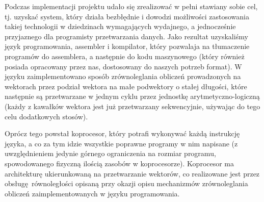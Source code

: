 Podczas implementacji projektu udało się zrealizować w pełni stawiany sobie cel, tj. uzyskać system, który działa bezbłędnie i dowodzi możliwości zastosowania takiej technologii w dziedzinach wymagających wydajnego, a jednocześnie przyjaznego dla programisty przetwarzania danych. Jako rezultat uzyskaliśmy język programowania, assembler i kompilator, który pozwalaja na tłumaczenie programów do assemblera, a następnie do kodu maszynowego (który również posiada opracowany przez nas, dostosowany do naszych potrzeb format). W języku zaimplementowano sposób zrównoleglania obliczeń prowadzonych na wektorach przez podział wektora na małe podwektory o stałej długości, które następnie są przetwarzane w jednym cyklu przez jednostkę arytmetyczno-logiczną (każdy z kawałków wektora jest już przetwarzany sekwencyjnie, używając do tego celu dodatkowych stosów).

Oprócz tego powstał koprocesor, który potrafi wykonywać każdą instrukcję języka, a co za tym idzie wszystkie poprawne programy w nim napisane (z uwzględnieniem jedynie górnego ograniczenia na rozmiar programu, spowodowanego fizyczną ilością zasobów w koprocesorze). Koprocesor ma architekturę ukierunkowaną na przetwarzanie wektorów, co realizowane jest przez obsługę równoległości opisaną przy okazji opisu mechanizmów zrównoleglania obliczeń zaimplementowanych w języku programowania.
